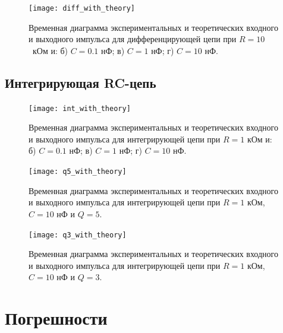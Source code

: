\begin{figure}[H]
\begin{center}
	\texttt{[image: diff\_with\_theory]}
	\captionsetup{margin=0cm}
	\caption{Временная диаграмма экспериментальных и теоретических входного и выходного импульса для дифференцирующей цепи при $R = 10$~кОм и: б) $C = 0.1$ нФ; в) $C = 1$ нФ; г) $C = 10$ нФ.} 
	\label{fig:diff}
\end{center}
\end{figure}

\subsection{Интегрирующая RC-цепь}

\begin{figure}[H]
\begin{center}
	\texttt{[image: int\_with\_theory]}
	\captionsetup{justification=centering}
	\caption{Временная диаграмма экспериментальных и теоретических входного и выходного импульса для интегрирующей цепи при $R = 1$ кОм и: б) $C = 0.1$ нФ; в) $C = 1$ нФ; г) $C = 10$ нФ.} 
	\label{fig:int}
\end{center}
\end{figure}

\def\belowcaptionskip{-20pt}

\begin{figure}[H]
\begin{center}
	\texttt{[image: q5\_with\_theory]}
	\captionsetup{justification=centering}
	\caption{Временная диаграмма экспериментальных и теоретических входного и выходного импульса для интегрирующей цепи при $R = 1$ кОм, $C = 10$ нФ и $Q = 5$.} 
	\label{fig:int_q5}
\end{center}
\end{figure}

\begin{figure}[H]
\begin{center}
	\texttt{[image: q3\_with\_theory]}
	\captionsetup{justification=centering}
	\caption{Временная диаграмма экспериментальных и теоретических входного и выходного импульса для интегрирующей цепи при $R = 1$ кОм, $C = 10$ нФ и $Q = 3$.}
	\label{fig:int_q3}
\end{center}
\end{figure}

\def\belowcaptionskip{0pt}

\section{Погрешности}

